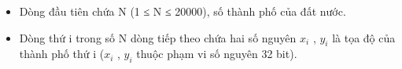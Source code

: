 \begin{itemize}
	\item Dòng đầu tiên chứa N (1 ≤ N ≤ 20000), số thành phố của đất nước.
	\item Dòng thứ i trong số N dòng tiếp theo chứa hai số nguyên $x_{i}$ , $y_{i}$ là tọa độ của thành phố thứ i ($x_{i}$ , $y_{i}$ thuộc phạm vi số nguyên 32 bit).
\end{itemize}